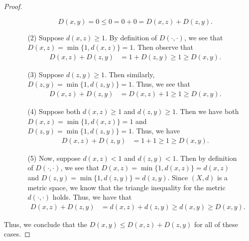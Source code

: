 \documentclass{article}
\begin{document}
\begin{enumerate}
\begin{proof}
\begin{enumerate}
\begin{enumerate}
                        \[ D(x,y) = 0 \leq 0 =  0 + 0 = D(x,z) + D(z,y). \]
                    \item[(2)] Suppose \( d(x,z) \geq 1  \). By definition of \( D(\cdot, \cdot)  \), we see that \( D(x,z) = \min \{ 1, d(x,z) \} = 1  \). 
                        Then observe that
                        \begin{align*}
                            D(x,z) + D(z,y) &= 1 + D(z,y) \geq 1 \geq D(x,y).
                        \end{align*}
                    \item[(3)] Suppose \( d(z,y) \geq 1  \). Then similarly, \( D(z,y) = \min \{ 1, d(z,y)  \} = 1  \). Thus, we see that
                        \begin{align*}
                            D(x,z) + D(z,y) &= D(x,z) + 1 \geq 1 \geq D(x,y).
                        \end{align*}
                    \item[(4)] Suppose both \( d(x,z) \geq 1  \) and \( d(z,y) \geq 1  \). Then we have both \( D(x,z) = \min \{ 1, d(x,z) \}  = 1  \) and \( D(z,y) = \min \{ 1, d(z,y) \}  = 1  \). Thus, we have
                        \begin{align*}
                            D(x,z) + D(z,y) &= 1 + 1 \geq 1 \geq D(x,y).
                        \end{align*}
                    \item[(5)] Now, suppose \( d(x,z) < 1  \) and \( d(z,y) < 1 \). Then by definition of \( D(\cdot, \cdot) \), we see that \( D(x,z) = \min \{1, d(x,z) \} = d(x,z) \) and \( D(z,y) = \min \{ 1, d(z,y) \}  = d(z,y) \). Since \( (X,d) \) is a metric space, we know that the triangle inequality for the metric \( d(\cdot, \cdot) \) holds. Thus, we have that 
                        \begin{align*}
                           D(x,z) + D(z,y)  &= d(x,z) + d(z,y) \geq d(x,y) \geq D(x,y).
                        \end{align*}
                \end{enumerate}
        \end{enumerate}
        Thus, we conclude that the \( D(x,y) \leq D(x,z) + D(z,y) \) for all of these cases.
        \end{proof}
\end{enumerate}
\end{document}
